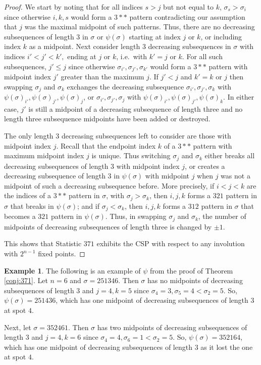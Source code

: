\documentclass{amsart}
\theoremstyle{definition}
\newtheorem{example}[thm]{Example}
\begin{document}
\begin{proof}
  We start by noting that for all indices $s>j$ but not equal to $k$, $\sigma_s>\sigma_i$ since otherwise $i,k,s$ would form a $3**$ pattern contradicting our assumption that $j$ was the maximal midpoint of such patterns.  Thus, there are no decreasing subsequences of length 3 in $\sigma$ or $\psi(\sigma)$ starting at index $j$ or $k$, or including index $k$ as a midpoint.
  Next consider length 3 decreasing subsequences in $\sigma$ with indices $i'<j'<k',$ ending at $j$ or $k$, i.e.\ with $k'=j$ or $k.$ For all such subsequences, $j'\leq j$ since otherwise $\sigma_{i'},\sigma_{j'},\sigma_{k'}$ would form a $3**$ pattern with midpoint index $j'$ greater than the maximum $j$.  If $j'<j$ and $k'=k$ or $j$ then swapping $\sigma_j$ and $\sigma_k$ exchanges the decreasing subsequence $\sigma_{i'},\sigma_{j'}, \sigma_{k}$ with $\psi(\sigma)_{i'},\psi(\sigma)_{j'}, \psi(\sigma)_j$, or $\sigma_{i'},\sigma_{j'}, \sigma_{j}$ with $\psi(\sigma)_{i'},\psi(\sigma)_{j'}, \psi(\sigma)_k.$  In either case, $j'$ is still a midpoint of a decreasing subsequence of length three and no length three subsequence midpoints have been added or destroyed.

  The only length 3 decreasing subsequences left to consider are those with midpoint index $j$.  Recall that the endpoint index $k$ of a $3**$ pattern with maximum midpoint index $j$ is unique.  Thus switching $\sigma_j$ and $\sigma_k$ either breaks all decreasing subsequences of length $3$ with midpoint index $j$, or creates a decreasing subsequence of length 3 in $\psi(\sigma)$ with midpoint $j$ when $j$ was not a midpoint of such a decreasing subsequence before.  More precisely, if $i<j<k$ are the indices of a $3**$ pattern in $\sigma$, with $\sigma_j > \sigma_k$, then $i,j,k$ forms a $321$ pattern in $\sigma$ that breaks in $\psi(\sigma)$; and if $\sigma_j < \sigma_k$, then $i,j,k$ forms a $312$ pattern in $\sigma$ that becomes a $321$ pattern in $\psi(\sigma)$. Thus, in swapping $\sigma_j$ and $\sigma_k$, the number of midpoints of decreasing subsequences of length three is changed by $\pm 1.$


  This shows that Statistic $371$ exhibits the CSP with respect to  any involution with $2^{n-1}$ fixed points.
\end{proof}

\begin{example}\label{ex: 3**}
  The following is an example of $\psi$ from the proof of Theorem \ref{conj:371}. Let $n = 6$ and $\sigma = 251346$. Then $\sigma$ has no midpoints of decreasing subsequences of length $3$ and $j = 4, k = 5$ since $\sigma_4 = 3, \sigma_5 = 4 < \sigma_2 = 5$. So, $\psi(\sigma) = 251436$, which has one midpoint of decreasing subsequences of length $3$ at spot $4$.

  Next, let $\sigma = 352461$. Then $\sigma$ has two midpoints of decreasing subsequences of length $3$ and $j = 4, k = 6$ since $\sigma_4 = 4, \sigma_6 = 1 < \sigma_2 = 5$. So, $\psi(\sigma) = 352164$, which has one midpoint of decreasing subsequences of length $3$ as it lost the one at spot $4$.
\end{example}
\end{document}
